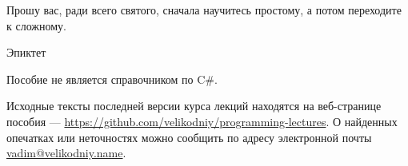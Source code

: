 
\epigraph{Прошу вас, ради всего святого, сначала научитесь простому, а
потом переходите к сложному.}{Эпиктет}

\lipsum[1-7]

Пособие не является справочником по C\#.

Исходные тексты последней версии курса лекций находятся на
веб-странице пособия —
\url{https://github.com/velikodniy/programming-lectures}. О найденных
опечатках или неточностях можно сообщить по адресу электронной почты
\href{mailto:vadim@veikodniy.name}{vadim@velikodniy.name}.
